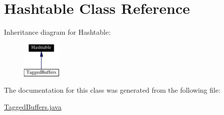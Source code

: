 \hypertarget{classHashtable}{
\section{Hashtable  Class Reference}
\label{classHashtable}
}
Inheritance diagram for Hashtable:\begin{figure}[H]
\begin{center}
\leavevmode
\includegraphics[width=53pt]{classHashtable__inherit__graph}
\end{center}
\end{figure}


The documentation for this class was generated from the following file:\begin{CompactItemize}
\item 
\hyperlink{TaggedBuffers_8java-source}{Tagged\-Buffers.java}\end{CompactItemize}
